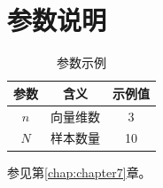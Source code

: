 \chapter{参数说明}
\label{app:parameters}

\begin{table}[htbp]
  \centering
  \caption{参数示例}\label{tab:parameters}
  \begin{tabular}{ccc}
    \toprule
    参数 & 含义 & 示例值 \\
    \midrule
    \(n\) & 向量维数 & 3 \\
    \(N\) & 样本数量 & 10 \\
    \bottomrule
  \end{tabular}
\end{table}

参见第\ref{chap:chapter7}章。
